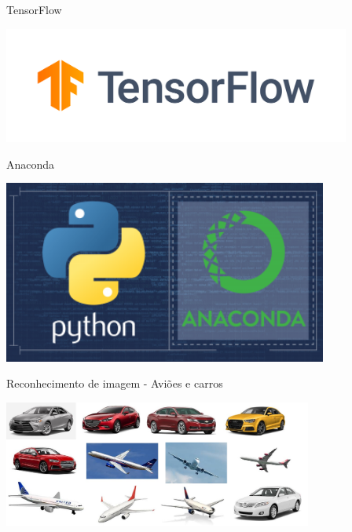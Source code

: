 \documentclass[
  ignorenonframetext,
]{beamer}
\begin{document}
\begin{frame}{TensorFlow}
\protect\hypertarget{tensorflow}{}

\includegraphics[width=4.5in]{IMAGENS/TensorFlow_logo}

\begin{center}
\tiny{}
\end{center}

\end{frame}

\begin{frame}{Anaconda}
\protect\hypertarget{anaconda}{}

\includegraphics[width=4.2in]{IMAGENS/Anaconda}

\begin{center}
\tiny{}
\end{center}

\end{frame}

\begin{frame}{Reconhecimento de imagem - Aviões e carros}
\protect\hypertarget{reconhecimento-de-imagem---aviuxf5es-e-carros}{}

\includegraphics[width=4.0in]{IMAGENS/Avioes_carros}

\begin{center}
\tiny{}
\end{center}

\end{frame}
\end{document}
